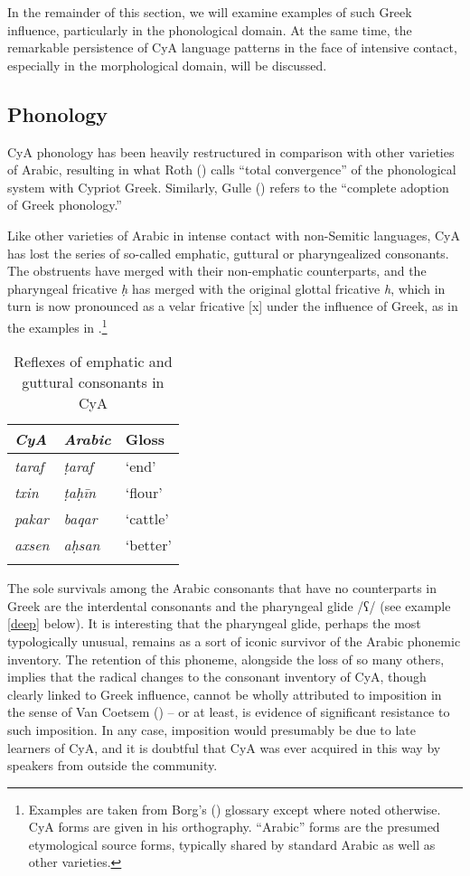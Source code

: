 \documentclass[output=paper]{langsci/langscibook}
\begin{document}
In the remainder of this section, we will examine examples of such Greek influence, particularly in the phonological domain. At the same time, the remarkable persistence of CyA language patterns in the face of intensive contact, especially in the morphological domain, will be discussed.

\subsection{Phonology}

CyA phonology has been heavily restructured in comparison with other varieties of Arabic, resulting in what Roth (\citeyear[55]{Roth2004}) calls “total convergence” of the phonological system with Cypriot Greek. Similarly, Gulle (\citeyear[47]{Gulle2016}) refers to the “complete adoption of Greek phonology.” 

Like other varieties of Arabic in intense contact with non-Semitic languages, CyA has lost the series of so-called emphatic, guttural or pharyngealized consonants. The obstruents have merged with their non-emphatic counterparts, and the pharyngeal fricative \textit{ḥ} has merged with the original glottal fricative \textit{h}, which in turn is now pronounced as a velar fricative [x] under the influence of Greek, as in the examples in .\footnote{Examples are taken from Borg's (\citeyear{Borg2004}) glossary except where noted otherwise. CyA forms are given in his orthography. “Arabic” forms are the presumed etymological source forms, typically shared by standard Arabic as well as other varieties.}  

\begin{table}
\begin{tabular}{>{\itshape}l>{\itshape}ll}
\lsptoprule
{\normalfont CyA} & {\normalfont Arabic} & {Gloss}\\\midrule
taraf & ṭaraf & ‘end’\\
txin & ṭaḥīn & ‘flour’\\
pakar & baqar & ‘cattle’\\
axsen & aḥsan & ‘better’\\
\lspbottomrule
\end{tabular}
\caption{\label{bkm:Ref13774757}Reflexes of emphatic and guttural consonants in CyA\label{tab:walter:1}}
\end{table}

The sole survivals among the Arabic consonants that have no counterparts in Greek are the interdental consonants and the pharyngeal glide /ʕ/ (see example \ref{deep} below). It is interesting that the pharyngeal glide, perhaps the most typologically unusual, remains as a sort of iconic survivor of the Arabic phonemic inventory. The retention of this phoneme, alongside the loss of so many others, implies that the radical changes to the consonant inventory of CyA, though clearly linked to Greek influence, cannot be wholly attributed to imposition in the sense of Van Coetsem (\citeyear{VanCoetsem1988,VanCoetsem2000}) – or at least, is evidence of significant resistance to such imposition. In any case, imposition would presumably be due to late learners of CyA, and it is doubtful that CyA was ever acquired in this way by speakers from outside the community.
\end{document}
